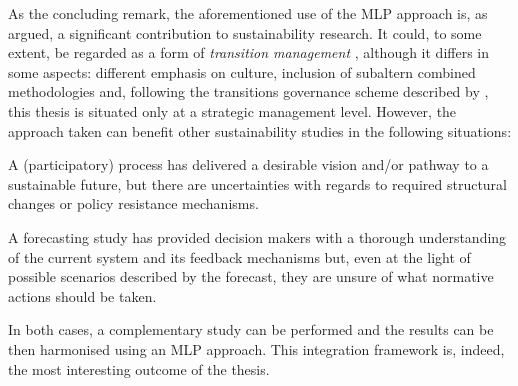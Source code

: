 As the concluding remark, the aforementioned use of the MLP approach is, as argued, a significant contribution to sustainability research. It could, to some extent, be regarded as a form of \emph{transition management} \parencite{rotmans2001_Moreevolutionthan,kemp2011_TransitionManagementas}, although it differs in some aspects: different emphasis on culture, inclusion of subaltern combined methodologies and, following the transitions governance scheme described by \textcite{kemp2007_Transitionmanagementas}, this thesis is situated only at a strategic management level. However, the approach taken can benefit other sustainability studies in the following situations:
\begin{enumeratealpha}
\item A (participatory) process has delivered a desirable vision and/or pathway to a sustainable future, but there are uncertainties with regards to required structural changes or policy resistance mechanisms.
\item A forecasting study has provided decision makers with a thorough understanding of the current system and its feedback mechanisms but, even at the light of possible scenarios described by the forecast, they are unsure of what normative actions should be taken.
\end{enumeratealpha}
In both cases, a complementary study can be performed and the results can be then harmonised using an MLP approach. This integration framework is, indeed, the most interesting outcome of the thesis.